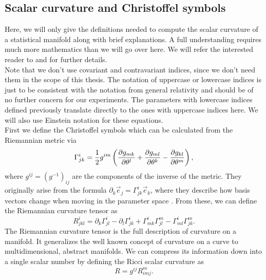\subsection{Scalar curvature and Christoffel symbols}\label{sec:Curvature}
Here, we will only give the definitions needed to compute the scalar curvature of a statistical manifold along with brief explanations. A full understanding requires much more mathematics than we will go over here. We will refer the interested reader to \cite{AmarisLectureNotes} and \cite{GeneralRelativityBook} for further details.\\
Note that we don't use covariant and contravariant indices, since we don't need them in the scope of this thesis. The notation of uppercase or lowercase indices is just to be consistent with the notation from general relativity and should be of no further concern for our experiments. The parameters with lowercase indices defined previously translate directly to the ones with uppercase indices here. We will also use Einstein notation for these equations.\\
First we define the Christoffel symbols which can be calculated from the Riemannian metric via \cite{GeneralRelativityBook}
\begin{equation}
	\Gamma^{i}_{jk} = \frac{1}{2}g^{im} \left(\frac{\partial g_{mk}}{\partial\theta^l} + \frac{\partial g_{ml}}{\partial\theta^k} - \frac{\partial g_{kl}}{\partial\theta^m}\right),
\end{equation} 
where $g^{ij} = (g^{-1})_{ij}$ are the components of the inverse of the metric. They originally arise from the formula $\partial_k \vec{e}_j = \Gamma^i_{jk} \vec{e}_k$, where they describe how basis vectors change when moving in the parameter space \cite{GeneralRelativityBook}.
From these, we can define the Riemannian curvature tensor as \cite{GeneralRelativityBook}
\begin{equation}
	R^{i}_{jkl} = \partial_k \Gamma^i_{jl} - \partial_l \Gamma^i_{jk} + \Gamma^i_{mk}\Gamma^m_{jl} - \Gamma^i_{ml}\Gamma^m_{jk}.
\end{equation}
The Riemannian curvature tensor is the full description of curvature on a manifold. It generalizes the well known concept of curvature on a curve to multidimensional, abstract manifolds. We can compress its information down into a single scalar number by defining the Ricci scalar curvature as \cite{GeneralRelativityBook}
\begin{equation}
	R = g^{ij} R^m_{imj}.
\end{equation}
